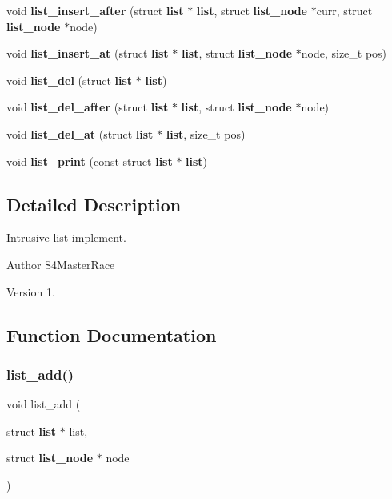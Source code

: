 \begin{DoxyCompactItemize}
\item 
void \textbf{ list\+\_\+insert\+\_\+after} (struct \textbf{ list} $\ast$\textbf{ list}, struct \textbf{ list\+\_\+node} $\ast$curr, struct \textbf{ list\+\_\+node} $\ast$node)
\item 
void \textbf{ list\+\_\+insert\+\_\+at} (struct \textbf{ list} $\ast$\textbf{ list}, struct \textbf{ list\+\_\+node} $\ast$node, size\+\_\+t pos)
\item 
void \textbf{ list\+\_\+del} (struct \textbf{ list} $\ast$\textbf{ list})
\item 
void \textbf{ list\+\_\+del\+\_\+after} (struct \textbf{ list} $\ast$\textbf{ list}, struct \textbf{ list\+\_\+node} $\ast$node)
\item 
void \textbf{ list\+\_\+del\+\_\+at} (struct \textbf{ list} $\ast$\textbf{ list}, size\+\_\+t pos)
\item 
void \textbf{ list\+\_\+print} (const struct \textbf{ list} $\ast$\textbf{ list})
\end{DoxyCompactItemize}


\subsection{Detailed Description}
Intrusive list implement. 

\begin{DoxyAuthor}{Author}
S4\+Master\+Race 
\end{DoxyAuthor}
\begin{DoxyVersion}{Version}
1. 
\end{DoxyVersion}


\subsection{Function Documentation}
\mbox{\label{list_8c_a9a78b4aa6e818c4b9e3da16cf3d1e9cf}} 
\subsubsection{list\+\_\+add()}
{\footnotesize\ttfamily void list\+\_\+add (\begin{DoxyParamCaption}\item[{struct \textbf{ list} $\ast$}]{list,  }\item[{struct \textbf{ list\+\_\+node} $\ast$}]{node }\end{DoxyParamCaption})\hspace{0.3cm}{\ttfamily [inline]}}


